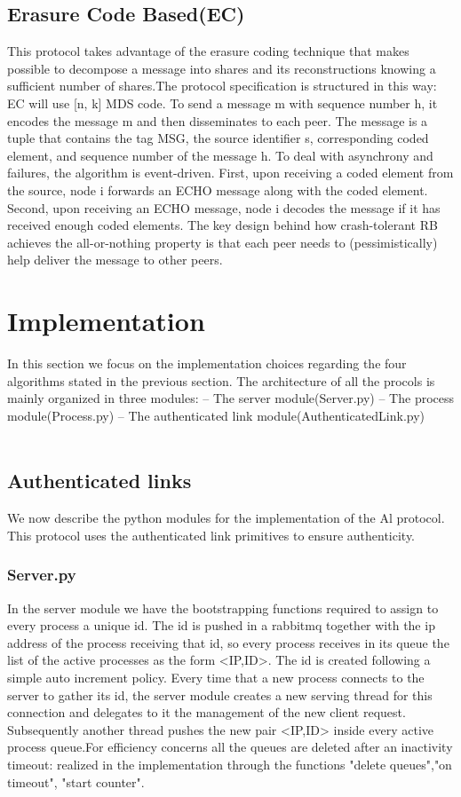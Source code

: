 \documentclass[12pt]{article}
\begin{document}
\subsection{ Erasure Code Based(EC)}
This protocol takes advantage of the erasure coding technique that makes possible to decompose a message into shares and its reconstructions knowing a sufficient number of shares.The protocol specification is structured in this way:
EC will use [n, k] MDS code. To send a message m with sequence number h, it encodes the message m and then disseminates to each peer. The message is a tuple that contains the tag MSG, the source identifier s, corresponding coded element, and sequence number of the message h. To deal with asynchrony and failures, the algorithm is event-driven. First, upon receiving a coded element from the source, node i forwards an ECHO message along with the coded element. Second, upon receiving an ECHO message, node i decodes the message if it has received enough coded elements. The key design behind how crash-tolerant RB achieves the all-or-nothing property is that each peer needs to (pessimistically) help deliver the message to other peers. \\

\newpage

\section{Implementation}
In this section we focus on the implementation choices regarding the four algorithms stated in the previous section.
The architecture of all the procols is mainly organized in three modules:
    – The server module(Server.py)
    – The process module(Process.py)
    – The authenticated link module(AuthenticatedLink.py) \\
\\
\subsection{Authenticated links}
We now describe the python modules for the implementation of the Al protocol. This protocol uses the authenticated link primitives to ensure authenticity. \\
\subsubsection{Server.py}
In the server module we have the bootstrapping functions required to assign to every process a unique id. The id is pushed in a rabbitmq together with the ip address of the process receiving that id, so every process receives in its queue the list of the active processes as the form <IP,ID>. The id is created following a simple auto increment policy. Every time that a new process connects to the server to gather its id, the server module creates a new serving thread for this connection and delegates to it the management of the new client request. Subsequently another thread pushes the  new pair <IP,ID> inside every active process queue.For efficiency concerns all the queues are deleted after an inactivity timeout: realized in the implementation through the functions "delete queues","on timeout", "start counter". \\
\end{document}
